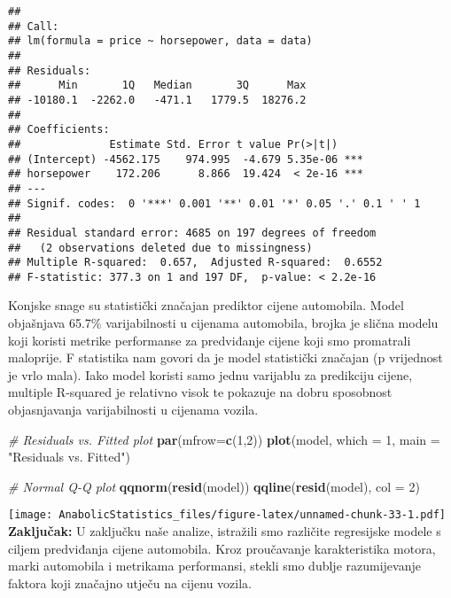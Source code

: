 \documentclass[
]{article}
\newenvironment{Shaded}{\begin{snugshade}}{\end{snugshade}}
\newcommand{\AttributeTok}[1]{\textcolor[rgb]{0.13,0.29,0.53}{#1}}
\newcommand{\CommentTok}[1]{\textcolor[rgb]{0.56,0.35,0.01}{\textit{#1}}}
\newcommand{\DecValTok}[1]{\textcolor[rgb]{0.00,0.00,0.81}{#1}}
\newcommand{\FunctionTok}[1]{\textcolor[rgb]{0.13,0.29,0.53}{\textbf{#1}}}
\newcommand{\NormalTok}[1]{#1}
\newcommand{\StringTok}[1]{\textcolor[rgb]{0.31,0.60,0.02}{#1}}
\begin{document}
\begin{verbatim}
## 
## Call:
## lm(formula = price ~ horsepower, data = data)
## 
## Residuals:
##      Min       1Q   Median       3Q      Max 
## -10180.1  -2262.0   -471.1   1779.5  18276.2 
## 
## Coefficients:
##              Estimate Std. Error t value Pr(>|t|)    
## (Intercept) -4562.175    974.995  -4.679 5.35e-06 ***
## horsepower    172.206      8.866  19.424  < 2e-16 ***
## ---
## Signif. codes:  0 '***' 0.001 '**' 0.01 '*' 0.05 '.' 0.1 ' ' 1
## 
## Residual standard error: 4685 on 197 degrees of freedom
##   (2 observations deleted due to missingness)
## Multiple R-squared:  0.657,  Adjusted R-squared:  0.6552 
## F-statistic: 377.3 on 1 and 197 DF,  p-value: < 2.2e-16
\end{verbatim}

Konjske snage su statistički značajan prediktor cijene automobila. Model
objašnjava 65.7\% varijabilnosti u cijenama automobila, brojka je slična
modelu koji koristi metrike performanse za predviđanje cijene koji smo
promatrali maloprije. F statistika nam govori da je model statistički
značajan (p vrijednost je vrlo mala). Iako model koristi samo jednu
varijablu za predikciju cijene, multiple R-squared je relativno visok te
pokazuje na dobru sposobnost objasnjavanja varijabilnosti u cijenama
vozila.

\begin{Shaded}
\begin{Highlighting}[]
\CommentTok{\# Residuals vs. Fitted plot}
\FunctionTok{par}\NormalTok{(}\AttributeTok{mfrow=}\FunctionTok{c}\NormalTok{(}\DecValTok{1}\NormalTok{,}\DecValTok{2}\NormalTok{))}
\FunctionTok{plot}\NormalTok{(model, }\AttributeTok{which =} \DecValTok{1}\NormalTok{, }\AttributeTok{main =} \StringTok{"Residuals vs. Fitted"}\NormalTok{)}

\CommentTok{\# Normal Q{-}Q plot}
\FunctionTok{qqnorm}\NormalTok{(}\FunctionTok{resid}\NormalTok{(model))}
\FunctionTok{qqline}\NormalTok{(}\FunctionTok{resid}\NormalTok{(model), }\AttributeTok{col =} \DecValTok{2}\NormalTok{)}
\end{Highlighting}
\end{Shaded}

\texttt{[image: AnabolicStatistics\_files/figure-latex/unnamed-chunk-33-1.pdf]}
\textbf{Zaključak:} U zaključku naše analize, istražili smo različite
regresijske modele s ciljem predviđanja cijene automobila. Kroz
proučavanje karakteristika motora, marki automobila i metrikama
performansi, stekli smo dublje razumijevanje faktora koji značajno
utječu na cijenu vozila.
\end{document}

